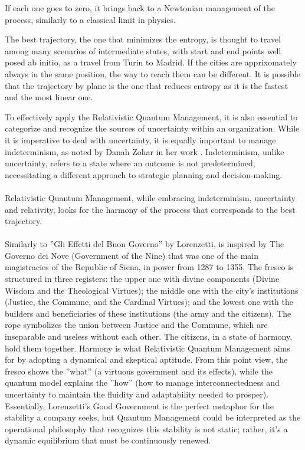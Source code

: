 \documentclass{article}
\begin{document}
If each one goes to zero, it brings back to a Newtonian management of the process, similarly to a classical limit in physics.

The best trajectory, the one that minimizes the entropy, is thought to travel among many scenarios of intermediate states, with start and end points well posed ab initio, as a travel from Turin to Madrid. If the cities are apprixomately always in the same position, the way to reach them can be different. It is possible that the trajectory by plane is the one that reduces entropy as it is the fastest and the most linear one.

To effectively apply the Relativistic Quantum Management, it is also essential to categorize and recognize the sources of uncertainty within an organization. While it is imperative to deal with uncertainty, it is equally important to manage indeterminism, as noted by Danah Zohar in her work \cite{zohar2021zerodistance}. Indeterminism, unlike uncertainty, refers to a state where an outcome is not predetermined, necessitating a different approach to strategic planning and decision-making.\\\\
Relativistic Quantum Management, while embracing indeterminism, uncertainty and relativity, looks for the harmony of the process that corresponds to the best trajectory.\\\\Similarly to ”Gli Effetti del Buon Governo” by Lorenzetti, is inspired by The Governo dei Nove (Government of the Nine)
that was one of the main magistracies of the Republic of Siena, in power from 1287 to 1355. The fresco is structured in three
registers: the upper one with divine components (Divine Wisdom and the Theological Virtues); the middle one with the
city’s institutions (Justice, the Commune, and the Cardinal Virtues); and the lowest one with the builders and beneficiaries
of these institutions (the army and the citizens). The rope symbolizes the union between Justice and the Commune, which
are inseparable and useless without each other. The citizens, in a state of harmony, hold them together.
Harmony is what Relativistic Quantum Management aims for by adopting a dynamical and skeptical aptitude. From
this point view, the fresco shows the ”what” (a virtuous government and its effects), while the quantum model explains the
”how” (how to manage interconnectedness and uncertainty to maintain the fluidity and adaptability needed to prosper).
Essentially, Lorenzetti’s Good Government is the perfect metaphor for the stability a company seeks, but Quantum
Management could be interpreted as the operational philosophy that recognizes this stability is not static; rather, it’s a
dynamic equilibrium that must be continuously renewed.
\end{document}
